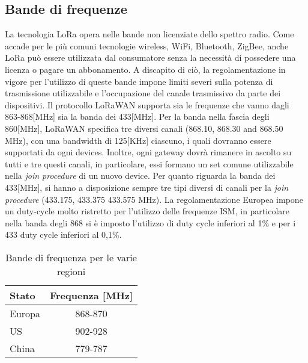 \subsection{Bande di frequenze}
La tecnologia LoRa opera nelle bande non licenziate dello spettro radio.  Come
accade per le più comuni tecnologie wireless, WiFi, Bluetooth, ZigBee, anche LoRa
può essere utilizzata dal consumatore senza la necessità di possedere una
licenza o pagare un abbonamento.
A discapito di ciò, la regolamentazione in vigore per l'utilizzo di queste bande 
impone limiti severi sulla potenza di trasmissione utilizzabile e l'occupazione
del canale trasmissivo da parte dei dispositivi.
Il protocollo  LoRaWAN supporta sia le frequenze che vanno dagli
863-868[MHz] sia la banda dei 433[MHz]. Per la banda  nella fascia
degli 860[MHz], LoRaWAN specifica tre diversi canali (868.10, 868.30 and 868.50
MHz), con una bandwidth di 125[KHz] ciascuno, i quali dovranno essere supportati
da ogni devices. Inoltre, ogni gateway dovrà
rimanere in ascolto su tutti e tre questi canali, in particolare, essi
formano un set comune utilizzabile nella \emph{join procedure} di un nuovo
device. Per
quanto riguarda la banda dei 433[MHz], si hanno a disposizione sempre tre tipi
diversi di canali per la \emph{join procedure} (433.175, 
433.375  433.575 MHz). 
La regolamentazione Europea impone un duty-cycle molto ristretto per l'utilizzo
delle frequenze ISM, in particolare nella banda degli 868 si è imposto
l'utilizzo di duty cycle inferiori al 1\% e per i 433 duty cycle inferiori al
0,1\%.
\begin{table}[ht]
        \centering
        \begin{tabular}{l|c}
                \toprule
                Stato   & Frequenza [MHz] \\
                \hline
                Europa  & 868-870 \\
                US      & 902-928 \\
                China   & 779-787 \\
                \bottomrule
        \end{tabular}
        \caption{Bande di frequenza per le varie regioni}
\end{table}

